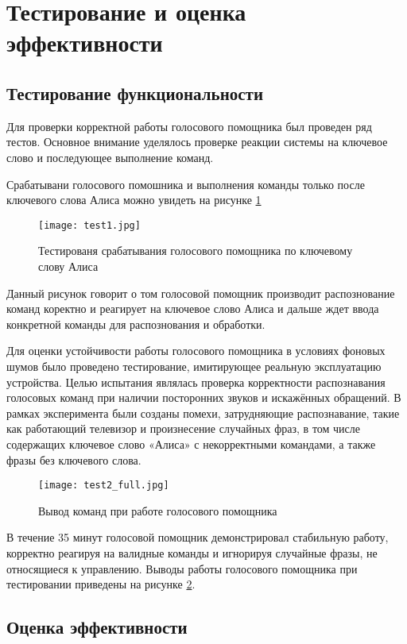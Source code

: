 \section{Тестирование и оценка эффективности}

\subsection{Тестирование функциональности}
Для проверки корректной работы голосового помощника был проведен ряд тестов. Основное внимание уделялось проверке реакции системы на ключевое слово и последующее выполнение команд. 

Срабатывани голосового помошника и выполнения команды только после ключевого слова Алиса можно увидеть на рисунке \ref{fig:test1}

\begin{figure}[H]
	\centering
	\texttt{[image: test1.jpg]}
	\caption{Тестированя срабатывания голосового помощника по ключевому слову Алиса}
	\label{fig:test1}
\end{figure}
Данный рисунок говорит о том голосовой помощник производит распознование команд коректно и реагирует на ключевое слово Алиса и дальше ждет ввода конкретной команды для распознования и обработки.


Для оценки устойчивости работы голосового помощника в условиях фоновых шумов было проведено тестирование, имитирующее реальную эксплуатацию устройства. Целью испытания являлась проверка корректности распознавания голосовых команд при наличии посторонних звуков и искажённых обращений. В рамках эксперимента были созданы помехи, затрудняющие распознавание, такие как работающий телевизор и произнесение случайных фраз, в том числе содержащих ключевое слово «Алиса» с некорректными командами, а также фразы без ключевого слова.

\begin{figure}[H]
	\centering
	\texttt{[image: test2\_full.jpg]}
	\caption{Вывод команд при работе голосового помощника}
	\label{fig:test2}
\end{figure}
В течение 35 минут голосовой помощник демонстрировал стабильную работу, корректно реагируя на валидные команды и игнорируя случайные фразы, не относящиеся к управлению. Выводы работы голосового помощника при тестировании приведены на рисунке \ref{fig:test2}.

\subsection{Оценка эффективности}

